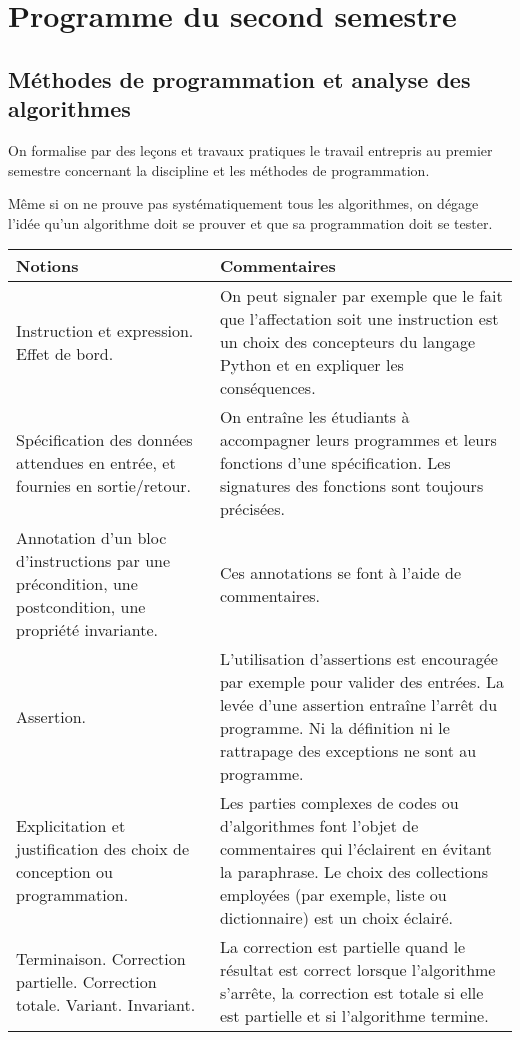 \section{Programme du second semestre}
\subsection{Méthodes de programmation et analyse des algorithmes}

On formalise par des leçons et travaux pratiques le travail entrepris au premier semestre concernant la discipline et les méthodes de programmation.

Même si on ne prouve pas systématiquement tous les algorithmes, on dégage l’idée qu’un algorithme doit se prouver et que sa programmation doit se tester.
\medskip

\begin{longtable}{|p{\lnotion}|p{\comment}|}
    \hline
    \textbf{Notions} & \textbf{Commentaires} \\
    \hline \hline
    Instruction et expression. Effet de bord. &
    On peut signaler par exemple que le fait que l'affectation soit une instruction est un choix des concepteurs du langage Python et en expliquer les conséquences.
    \\
    \hline
 Spécification des données attendues en entrée, et fournies en sortie/retour.
    &
    On entraîne les étudiants à accompagner
    leurs programmes et
      leurs fonctions d'une spécification. Les signatures des fonctions sont
       toujours précisées.\\ \hline
    Annotation d'un bloc d'instructions par une précondition, une postcondition, une propriété invariante.& Ces annotations se font à l'aide de commentaires. \\ \hline
    Assertion.
    &
    L'utilisation d'assertions est encouragée par exemple pour valider des entrées. La levée d'une assertion entraîne l'arrêt du programme. Ni la définition ni le rattrapage des exceptions ne sont au programme. \\ \hline
    Explicitation et justification des choix de conception ou programmation.
    &
    Les parties complexes de codes ou d'algorithmes font l'objet de commentaires qui l'éclairent en évitant la paraphrase. Le choix des collections employées (par exemple, liste ou dictionnaire) est un choix éclairé. \\ \hline
    Terminaison. Correction partielle. Correction totale. Variant. Invariant.
    &
    La correction est partielle quand le résultat est correct lorsque l'algorithme s'arrête, la correction est totale si elle est partielle et si l'algorithme termine.


\end{longtable}
